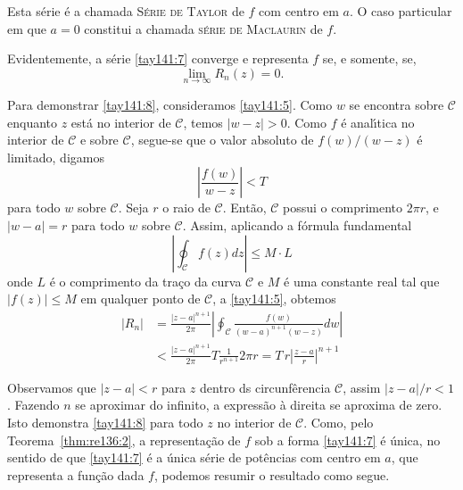 Esta s\'{e}rie \'{e} a chamada \textsc{S\'{e}rie de Taylor} de $f$ com centro
em $a$. O caso particular em que $a = 0$ constitui a chamada
\textsc{s\'{e}rie de Maclaurin} de $f$.

Evidentemente, a s\'{e}rie \eqref{tay141:7} converge e representa $f$
se, e somente, se,
\begin{equation}\label{tay141:8}
\lim_{n\to\infty} R_n(z) = 0.
\end{equation}

Para demonstrar \eqref{tay141:8}, consideramos \eqref{tay141:5}.
Como $w$ se encontra sobre $ \mathcal{C}$ enquanto $z$ est\'{a} no
interior de $ \mathcal{C}$, temos $|w - z|>0$. Como $f$ \'{e}
anal\'{\i}tica no interior de $ \mathcal{C}$ e sobre $\mathcal{C}$,
segue-se que o valor absoluto de $f(w)/(w-z)$ \'{e} limitado, digamos
\begin{equation*}
\left|\frac{f(w)}{w - z}\right|<T
\end{equation*}
para todo $w$ sobre $\mathcal{C}$. Seja $r$ o raio de $
\mathcal{C}$. Ent\~{a}o, $ \mathcal{C}$ possui o comprimento $2\pi r$,
e $|w - a | = r$ para todo $w$ sobre $\mathcal{C}$. Assim,
aplicando a f\'{o}rmula fundamental
\begin{equation*}
\left|\oint_{\mathcal{C}} f(z)dz \right|\leq M\cdot L
\end{equation*}
onde $L$ \'{e} o comprimento da tra\c{c}o da curva $\mathcal{C}$ e $M$ \'{e}
uma constante real tal que $|f(z)|\le M$ em qualquer ponto de
$\mathcal{C}$, a \eqref{tay141:5}, obtemos
\begin{align*}
|R_n| &= \frac{|z -a|^{n+1}}{2\pi}\left|\oint_{\mathcal{C}}
\frac{f(w)}{(w -a)^{n+1}(w-z)}dw\right|\\[2ex]
  &<\frac{|z -a|^{n+1}}{2\pi}T\frac{1}{r^{n+1}}2\pi r=T\,r\left|
  \frac{z-a}{r}\right|^{n+1}
\end{align*}

Observamos que $|z-a|<r$ para $z$ dentro ds circunf\^{e}rencia
$\mathcal{C}$, assim $|z-a|/r<1$. Fazendo $n$ se aproximar do
infinito,  a express\~{a}o \`{a} direita se aproxima de zero. Isto
demonstra \eqref{tay141:8} para todo $z$ no interior de $
\mathcal{C}$. Como, pelo Teorema~\ref{thm:re136:2}, a representa\c{c}\~{a}o de
$f$ sob a forma \eqref{tay141:7} \'{e} \'{u}nica, no sentido de que
\eqref{tay141:7} \'{e} a \'{u}nica s\'{e}rie de pot\^{e}ncias com centro em $a$,
que representa a fun\c{c}\~{a}o dada $f$, podemos resumir o resultado como
segue.

